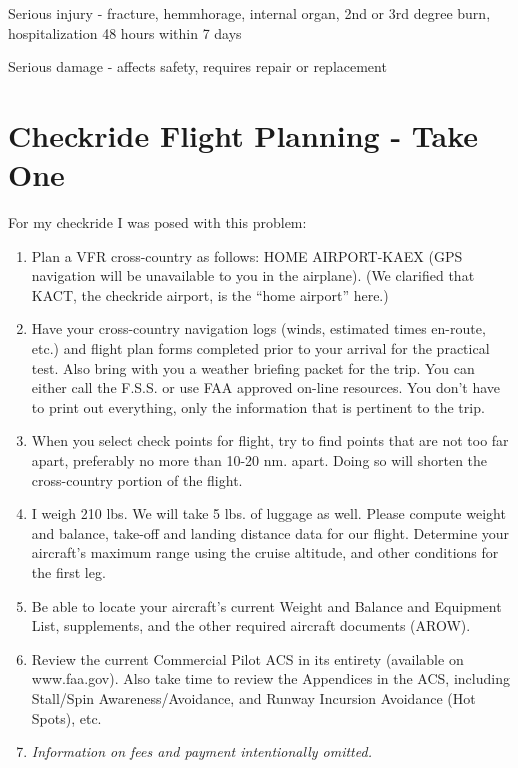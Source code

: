 Serious injury - fracture, hemmhorage, internal organ, 2nd or 3rd degree burn, hospitalization 48 hours within 7 days

Serious damage - affects safety, requires repair or replacement

\section{Checkride Flight Planning - Take One}

For my checkride I was posed with this problem:

\begin{enumerate}

\item Plan a VFR cross-country as follows: HOME AIRPORT-KAEX (GPS navigation will be unavailable to you in the airplane). (We clarified that KACT, the checkride airport, is the ``home airport'' here.)

\item Have your cross-country navigation logs (winds, estimated times en-route, etc.) and flight plan forms completed prior to your arrival for the practical test. Also bring with you a weather briefing packet for the trip. You can either call the F.S.S. or use FAA approved on-line resources. You don't have to print out everything, only the information that is pertinent to the trip.

\item When you select check points for flight, try to find points that are not too far apart, preferably no more than 10-20 nm. apart. Doing so will shorten the cross-country portion of the flight.

\item I weigh 210 lbs. We will take 5 lbs. of luggage as well. Please compute weight and balance, take-off and landing distance data for our flight. Determine your aircraft's maximum range using the cruise altitude, and other conditions for the first leg.

\item Be able to locate your aircraft's current Weight and Balance and Equipment List, supplements, and the other required aircraft documents (AROW).

\item Review the current Commercial Pilot ACS in its entirety (available on www.faa.gov). Also take time to review the Appendices in the ACS, including Stall/Spin Awareness/Avoidance, and Runway Incursion Avoidance (Hot Spots), etc.

\item \emph{Information on fees and payment intentionally omitted.}

\end{enumerate}

